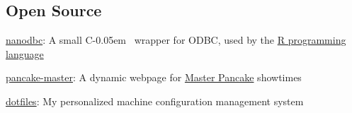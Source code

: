 \documentclass[12pt, line]{res}
\let\tempone\itemize
\let\temptwo\enditemize
\renewenvironment{itemize}{%
  \setlength{\topsep}{0pt}%
  \setlength{\partopsep}{0pt}%
  \tempone
  \renewcommand{\labelitemi}{$\bullet$}%
  \vspace{-0.25in}%
  \setlength{\itemsep}{3pt}%
  \setlength{\parsep}{0pt}%
}{%
  \temptwo
}
\newcommand{\Cpp}{C\kern-0.05em \raisebox{0.4ex}{\tiny\textbf{++}}}
\begin{document}
\begin{resume}
  \section{Open Source}
  \vspace{0.45in} %
  \begin{itemize}
    \item \href{http://nanodbc.io}{nanodbc}: A small \Cpp~wrapper for ODBC, used by the \href{https://github.com/r-dbi/odbc}{R programming language}
    \item \href{http://pancake.lexicalunit.com}{pancake-master}: A dynamic webpage for \href{https://drafthouse.com/series/master-pancake}{Master Pancake} showtimes
    \item \href{https://github.com/lexicalunit/dotfiles}{dotfiles}: My personalized machine configuration management system
  \end{itemize}


\end{resume}
\end{document}

